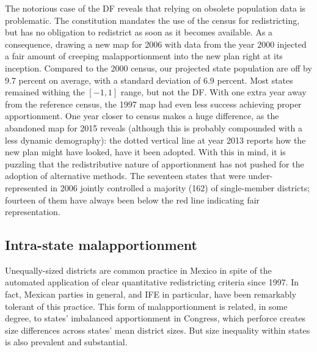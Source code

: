 \documentclass[letter,12pt]{article}
\begin{document}
The notorious case of the DF reveals that relying on obsolete population data is problematic. The constitution mandates the use of the census for redistricting, but has no obligation to redistrict as soon as it becomes available. As a consequence, drawing a new map for 2006 with data from the year 2000 injected a fair amount of creeping malapportionment into the new plan right at its inception. Compared to the 2000 census, our projected state population are off by 9.7 percent on average, with a standard deviation of 6.9 percent. Most states remained withing the $[-1,1]$ range, but not the DF. With one extra year away from the reference census, the 1997 map had even less success achieving proper apportionment. One year closer to census makes a huge difference, as the abandoned map for 2015 reveals (although this is probably compounded with a less dynamic demography): the dotted vertical line at year 2013 reports how the new plan might have looked, have it been adopted. With this in mind, it is puzzling that the redistributive nature of apportionment has not pushed for the adoption of alternative methods. The seventeen states that were under-represented in 2006 jointly controlled a majority (162) of single-member districts; fourteen of them have always been below the red line indicating fair representation. 


\subsection{Intra-state malapportionment}


Unequally-sized districts are common practice in Mexico in spite of the automated application of clear quantitative redistricting criteria since 1997. In fact, Mexican parties in general, and IFE in particular, have been remarkably tolerant of this practice. This form of malapportionment is related, in some degree, to states' imbalanced apportionment in Congress, which perforce creates size differences across states' mean district sizes. But size inequality within states is also prevalent and substantial. 
\end{document}
